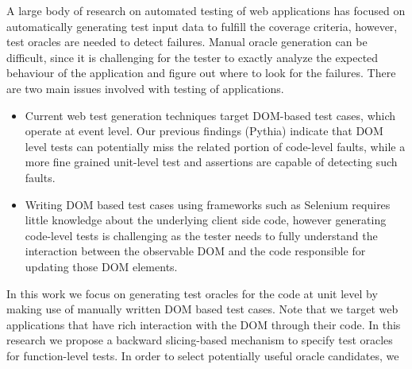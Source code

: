 A large body of research on automated testing of \javascript web applications has focused on
automatically generating test input data to fulfill the coverage criteria, however, test oracles are
needed to detect failures. Manual oracle generation can be difficult, since it is challenging for the
tester to exactly analyze the expected behaviour of the application and figure out where to look
for the failures. There are two main issues involved with testing of \javascript applications.
\begin{itemize}
\item Current web test generation techniques target DOM-based test cases,
which operate at event level. Our previous findings (Pythia) indicate that DOM level tests can potentially miss the related portion of
code-level faults, while a more fine grained unit-level test and assertions are capable of detecting such faults.
\item Writing DOM based test cases using frameworks such as Selenium
requires little knowledge about the underlying client side code, however generating code-level tests is
challenging as the tester needs to fully understand the interaction between the observable DOM
and the \javascript code responsible for updating those DOM elements.
\end{itemize}
In this work we focus on generating test oracles for the \javascript code at unit level by making
use of manually written DOM based test cases. Note that we target web applications that have
rich interaction with the DOM through their \javascript code. In this research we propose a
backward slicing-based mechanism to specify test oracles for \javascript function-level
tests. In order to select potentially useful oracle candidates, we 
